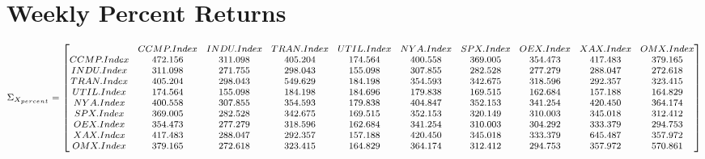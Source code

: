 \documentclass{article}
\begin{document}
\section*{Weekly Percent Returns}
\begin{equation*}
\begin{medsize}
\Sigma_{X_{percent}}=
\begin{bmatrix}{}
  & CCMP.Index & INDU.Index & TRAN.Index & UTIL.Index & NYA.Index & SPX.Index & OEX.Index & XAX.Index & OMX.Index \\ 
 CCMP.Index & 472.156 & 311.098 & 405.204 & 174.564 & 400.558 & 369.005 & 354.473 & 417.483 & 379.165 \\ 
  INDU.Index & 311.098 & 271.755 & 298.043 & 155.098 & 307.855 & 282.528 & 277.279 & 288.047 & 272.618 \\ 
  TRAN.Index & 405.204 & 298.043 & 549.629 & 184.198 & 354.593 & 342.675 & 318.596 & 292.357 & 323.415 \\ 
  UTIL.Index & 174.564 & 155.098 & 184.198 & 184.696 & 179.838 & 169.515 & 162.684 & 157.188 & 164.829 \\ 
  NYA.Index & 400.558 & 307.855 & 354.593 & 179.838 & 404.847 & 352.153 & 341.254 & 420.450 & 364.174 \\ 
  SPX.Index & 369.005 & 282.528 & 342.675 & 169.515 & 352.153 & 320.149 & 310.003 & 345.018 & 312.412 \\ 
  OEX.Index & 354.473 & 277.279 & 318.596 & 162.684 & 341.254 & 310.003 & 304.292 & 333.379 & 294.753 \\ 
  XAX.Index & 417.483 & 288.047 & 292.357 & 157.188 & 420.450 & 345.018 & 333.379 & 645.487 & 357.972 \\ 
  OMX.Index & 379.165 & 272.618 & 323.415 & 164.829 & 364.174 & 312.412 & 294.753 & 357.972 & 570.861 \\ 
  \end{bmatrix}
\end{medsize}
\end{equation*}
\end{document}
